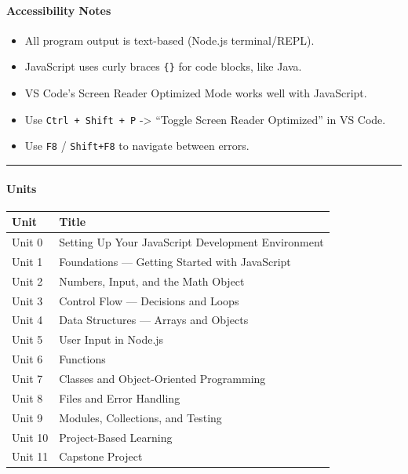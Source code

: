 \documentclass[
  justified,
  openright,
]{tufte-book}
\let\subsection\paragraph
\let\paragraph\paragraph
\let\subsection\paragraph
\let\paragraph\paragraph
\providecommand{\tightlist}{%
  \setlength{\itemsep}{0pt}\setlength{\parskip}{0pt}}
\begin{document}
\subsection{Accessibility Notes}\label{accessibility-notes}

\begin{itemize}
\tightlist
\item
  All program output is text-based (Node.js terminal/REPL).
\item
  JavaScript uses curly braces \texttt{\{\}} for code blocks, like Java.
\item
  VS Code's Screen Reader Optimized Mode works well with JavaScript.
\item
  Use \texttt{Ctrl\ +\ Shift\ +\ P} -\textgreater{} ``Toggle Screen
  Reader Optimized'' in VS Code.
\item
  Use \texttt{F8} / \texttt{Shift+F8} to navigate between errors.
\end{itemize}

\begin{center}\rule{0.5\linewidth}{0.5pt}\end{center}

\subsection{Units}\label{units}

\begin{fullwidth}{\def\LTcaptype{none} %
\begin{longtable}[]{@{}ll@{}}
\toprule\noalign{}
Unit & Title \\
\midrule\noalign{}
\endhead
\bottomrule\noalign{}
\endlastfoot
Unit 0 & Setting Up Your JavaScript Development Environment \\
Unit 1 & Foundations --- Getting Started with JavaScript \\
Unit 2 & Numbers, Input, and the Math Object \\
Unit 3 & Control Flow --- Decisions and Loops \\
Unit 4 & Data Structures --- Arrays and Objects \\
Unit 5 & User Input in Node.js \\
Unit 6 & Functions \\
Unit 7 & Classes and Object-Oriented Programming \\
Unit 8 & Files and Error Handling \\
Unit 9 & Modules, Collections, and Testing \\
Unit 10 & Project-Based Learning \\
Unit 11 & Capstone Project \\
\end{longtable}
}
\end{fullwidth}
\end{document}
